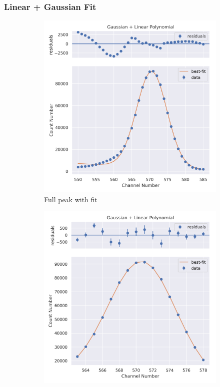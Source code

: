 \documentclass[11pt,a4paper]{article}
\begin{document}
\subsubsection{Linear + Gaussian Fit}
\begin{figure}[H]
  \centering
  \begin{subfigure}{.5\linewidth}
    \centering
    \includegraphics[width=\linewidth]{./Images/Barium133/Linear/Linear_1_Full.png}
    \caption{Full peak with fit}
  \end{subfigure}%
  \begin{subfigure}{.5\linewidth}
    \centering
    \includegraphics[width=\linewidth]{./Images/Barium133/Linear/Linear_1_Zoom.png}

\end{subfigure}
\end{figure}
\end{document}
